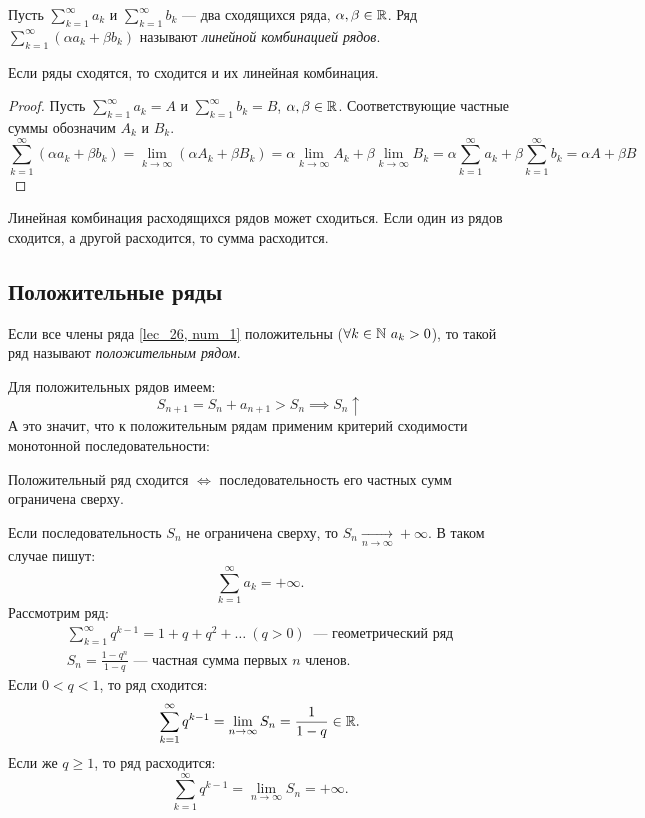 \documentclass[../../main.tex]{subfiles}
\begin{document}
Пусть $\sum\limits_{k = 1}^\infty a_k$  и $\sum\limits_{k = 1}^\infty b_k$
 --- два сходящихся ряда, $\alpha, \beta \in \mathbb{R}$.
Ряд $\sum\limits_{k = 1}^\infty(\alpha a_k + \beta b_k)$
 называют \emph{линейной комбинацией рядов}. 
\begin{thm}
Если ряды сходятся, то сходится и их линейная комбинация.
 \end{thm}
\begin{proof}
	Пусть  $\sum\limits_{k = 1}^\infty a_k = A$  
	и $\sum\limits_{k = 1}^\infty b_k = B$, \enspace
	 $\alpha, \beta \in \mathbb{R}$. Соответствующие частные суммы обозначим $A_k$ и 
	 $B_k$.
 	\[
 		\sum\limits_{k = 1}^\infty(\alpha a_k + \beta b_k) =
 		\lim\limits_{k \to \infty} (\alpha A_k + \beta B_k) =
 		\alpha\lim\limits_{k \to \infty} A_k +
 		\beta\lim\limits_{k \to \infty} B_k =
 		\alpha\sum\limits_{k = 1}^\infty a_k + 
 		\beta\sum\limits_{k = 1}^\infty b_k = \alpha A + 
 		\beta B
 	\]
 \end{proof}
 Линейная комбинация расходящихся рядов может сходиться.
 Если один из рядов сходится, а другой расходится, то 
 сумма расходится.
 \subsection{Положительные ряды}
\begin{definition}
Если все члены ряда \eqref{lec_26, num_1} положительны
($\forall k \in \N \ a_k > 0$),
то такой ряд называют \emph{положительным рядом}.
\end{definition}
Для положительных рядов имеем:
\[
	S_{n+1} = S_n + a_{n+1}  > S_n \implies S_n \uparrow
\]
А это значит, что к положительным рядам применим 
критерий сходимости монотонной последовательности:
 \begin{thm} 
 	\label{lec26:pos_series}
 	 Положительный ряд сходится $\iff$ последовательность 
 	его частных сумм ограничена сверху.
 \end{thm}
 \begin{rem}
 	 Если  последовательность $S_n$ не ограничена сверху, 
 	 то  $S_n\xrightarrow[n \to \infty]{}+\infty$. В таком случае пишут:
 	 \[
 		\sum\limits_{k = 1}^\infty a_k= +\infty
	.\]
	Рассмотрим ряд:
	 \begin{gather*}
 		\sum\limits_{k = 1}^\infty q^{k-1}=  1 + q + q^2 + \ldots
 		\ (q > 0)\ \text{ --- геометрический ряд}\\
 		S_n = \frac{1 - q^n}{1 - q} \text{ --- частная сумма первых $n$ членов}
	.\end{gather*}
	Если $0 < q < 1$, то ряд сходится:
	\[
	\sum\limits_{k = 1}^\infty q^{k-1} = \lim\limits_{n \to \infty} S_n =
	\frac{1}{1 - q} \in \mathbb{R}
	.\]
	Если же $q \geq 1$, то ряд расходится:
	\[
	\sum\limits_{k = 1}^\infty q^{k-1} = \lim\limits_{n \to \infty} S_n =
	+ \infty
	.\]
 \end{rem}
\end{document}
